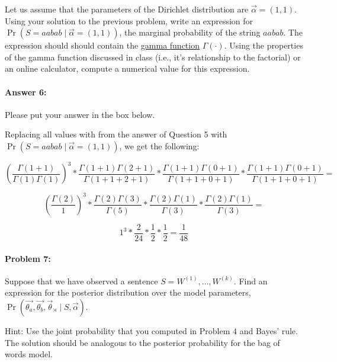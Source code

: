 \documentclass[10pt]{article}
\newenvironment{AnswerBox}{\begin{mdframed}[style=simple]}{\end{mdframed}}
\begin{document}
Let us assume that the parameters of the Dirichlet distribution are
$\vec{\alpha} = (1,1)$. Using your solution to the previous problem,
write an expression for $\Pr(S=aabab\mid \vec \alpha = (1,1))$,
the marginal probability of the string $aabab$.
The expression should should contain the
\href{https://en.wikipedia.org/wiki/Gamma_function}{gamma function}
$\Gamma(\cdot)$. Using the properties of the gamma function discussed
in class (i.e., it's relationship to the factorial) or an online
calculator, compute a numerical value for this expression.



\paragraph{Answer 6:} Please put your answer in the box below.


\begin{AnswerBox}%
Replacing all values with from the answer of Question 5 with $\Pr(S=aabab\mid \vec \alpha = (1,1))$, we get the following:

$$
(\frac{\Gamma(1+1)}
{\Gamma(1)\Gamma(1)})^3 *
\frac{\Gamma(1 + 1)\Gamma(2 + 1)}
{\Gamma(1 + 1 + 2 + 1)} *
\frac{\Gamma(1 + 1)\Gamma(0 + 1)}
{\Gamma(1 + 1 + 0 + 1)} *
\frac{\Gamma(1 + 1)\Gamma(0 + 1)}
{\Gamma(1 + 1 + 0 +1)} =
$$

$$
(\frac{\Gamma(2)}
{1})^3 *
\frac{\Gamma(2)\Gamma(3)}
{\Gamma(5)} *
\frac{\Gamma(2)\Gamma(1)}
{\Gamma(3)} *
\frac{\Gamma(2)\Gamma(1)}
{\Gamma(3)} =
$$

$$
1^3 *
\frac{2}
{24} *
\frac{1}
{2} *
\frac{1}
{2} = \frac{1}{48}
$$

    
\end{AnswerBox}%

\hrulefill %

\paragraph{Problem 7:}

Suppose that we have observed a sentence
$S=W^{(1)},\dots,W^{(k)}$. Find an expression for the posterior
distribution over the model parameters,
$\Pr(\vec{\theta_a}, \vec{\theta_b}, \vec{\theta}_{\rtimes} \mid S,
\vec{\alpha})$.

 Hint: Use the joint probability that you computed in Problem
4 and Bayes' rule. The solution should be analogous to the posterior
probability for the bag of words model.
\end{document}
